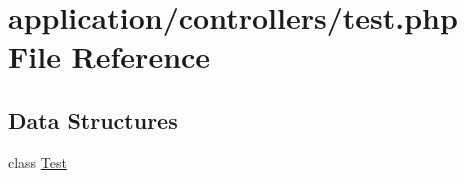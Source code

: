 \hypertarget{test_8php}{\section{application/controllers/test.php File Reference}
\label{test_8php}
}
\subsection*{Data Structures}
\begin{DoxyCompactItemize}
\item 
class \hyperlink{class_test}{Test}
\end{DoxyCompactItemize}
